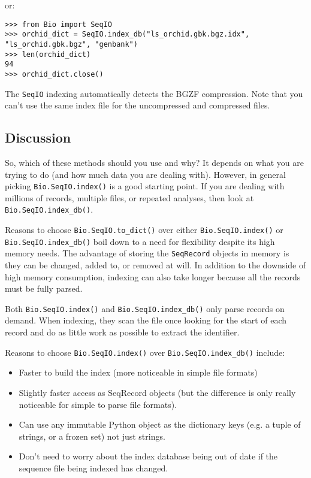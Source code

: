 \documentclass{report}
\begin{document}
\noindent
or:

\begin{verbatim}
>>> from Bio import SeqIO
>>> orchid_dict = SeqIO.index_db("ls_orchid.gbk.bgz.idx", "ls_orchid.gbk.bgz", "genbank")
>>> len(orchid_dict)
94
>>> orchid_dict.close()
\end{verbatim}

The \verb|SeqIO| indexing automatically detects the BGZF compression. Note
that you can't use the same index file for the uncompressed and compressed files.

\subsection{Discussion}
\label{sec:SeqIO-indexing-discussion}

So, which of these methods should you use and why? It depends on what you are
trying to do (and how much data you are dealing with). However, in general
picking \verb|Bio.SeqIO.index()| is a good starting point. If you are dealing
with millions of records, multiple files, or repeated analyses, then look at
\verb|Bio.SeqIO.index_db()|.

Reasons to choose \verb|Bio.SeqIO.to_dict()| over either
\verb|Bio.SeqIO.index()| or \verb|Bio.SeqIO.index_db()| boil down to a need
for flexibility despite its high memory needs. The advantage of storing the
\verb|SeqRecord| objects in memory is they can be changed, added to, or
removed at will. In addition to the downside of high memory consumption,
indexing can also take longer because all the records must be fully parsed.

Both \verb|Bio.SeqIO.index()| and \verb|Bio.SeqIO.index_db()| only parse
records on demand. When indexing, they scan the file once looking for the
start of each record and do as little work as possible to extract the
identifier.

Reasons to choose \verb|Bio.SeqIO.index()| over \verb|Bio.SeqIO.index_db()|
include:
\begin{itemize}
\item Faster to build the index (more noticeable in simple file formats)
\item Slightly faster access as SeqRecord objects (but the difference is only
really noticeable for simple to parse file formats).
\item Can use any immutable Python object as the dictionary keys (e.g. a
tuple of strings, or a frozen set) not just strings.
\item Don't need to worry about the index database being out of date if the
sequence file being indexed has changed.
\end{itemize}
\end{document}
